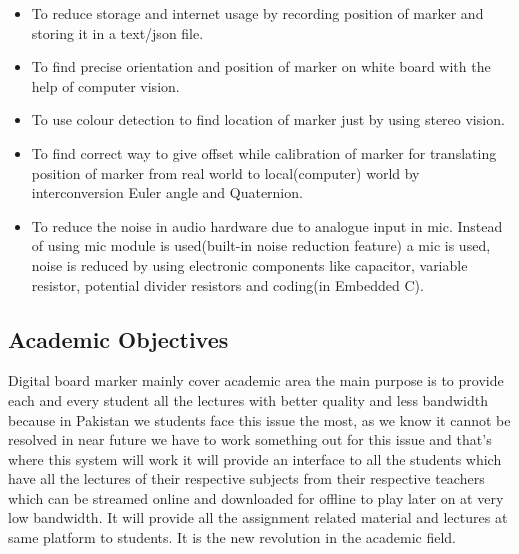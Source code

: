 \begin{itemize}

\item To reduce storage and internet usage by recording position of marker and storing it in a text/json file.
\item To find precise orientation and position of marker on white board with the help of computer vision.
\item To use colour detection to find location of marker just by using stereo vision.
\item To find correct way to give offset while calibration of marker for translating position of marker from real world to local(computer) world by interconversion Euler angle and Quaternion.
\item To reduce the noise in audio hardware due to analogue input in mic. Instead of using mic module is used(built-in noise reduction feature) a mic is used, noise is reduced by using electronic components like capacitor, variable resistor, potential divider resistors and coding(in Embedded C).


\end{itemize}

\bigskip

\subsection{Academic Objectives}
Digital board marker mainly cover academic area the main purpose is to provide each and every student all the lectures with better quality and less bandwidth because in Pakistan we students face this issue the most, as we know it cannot be resolved in near future we have to work something out for this issue and that's where this system will work it will provide an interface to all the students which have all the lectures of their respective subjects from their respective teachers which can be streamed online and downloaded for offline to play later on at very low bandwidth. It will provide all the assignment related material and lectures at same platform to students. It is the new revolution in the academic field.

